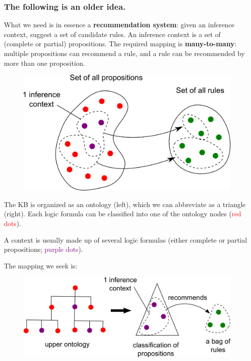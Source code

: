 \underconst

\subsubsection{The following is an older idea.}  What we need is in essence a \textbf{recommendation system}:  given an inference context, suggest a set of candidate rules.  An inference context is a set of (complete or partial) propositions.  The required mapping is \textbf{many-to-many}:  multiple propositions can recommend a rule, and a rule can be recommended by more than one proposition.
\begin{figure}[H]
\centering
\includegraphics[scale=1]{many-to-many-mapping.png}
\end{figure}

The KB is organized as an ontology (left), which we can abbreviate as a triangle (right).  Each logic formula can be classified into one of the ontology nodes (\textcolor{red}{red dots}).

A context is usually made up of several logic formulas (either complete or partial propositions;  \textcolor{Purple}{purple dots}).

The mapping we seek is:
\begin{figure}[H]
\centering
\includegraphics[scale=1]{ontology-triangular-form.png}
\end{figure}

